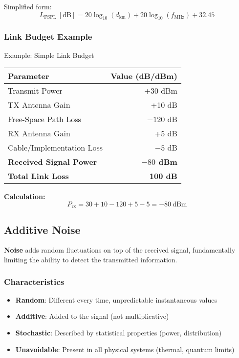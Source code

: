 Simplified form:
\begin{equation}
L_{\text{FSPL}}\ [\text{dB}] = 20\log_{10}(d_{\text{km}}) + 20\log_{10}(f_{\text{MHz}}) + 32.45
\end{equation}

\subsubsection{Link Budget Example}

\begin{calloutbox}{Example: Simple Link Budget}
\begin{tabular}{@{}lr@{}}
\toprule
\textbf{Parameter} & \textbf{Value (dB/dBm)} \\
\midrule
Transmit Power & +30 dBm \\
TX Antenna Gain & +10 dB \\
Free-Space Path Loss & $-120$ dB \\
RX Antenna Gain & +5 dB \\
Cable/Implementation Loss & $-5$ dB \\
\midrule
\textbf{Received Signal Power} & \textbf{$-80$ dBm} \\
\textbf{Total Link Loss} & \textbf{100 dB} \\
\bottomrule
\end{tabular}

\vspace{0.3cm}
\textbf{Calculation:}
\[
P_{\text{rx}} = 30 + 10 - 120 + 5 - 5 = -80\ \text{dBm}
\]
\end{calloutbox}

\subsection{Additive Noise}

\textbf{Noise} adds random fluctuations on top of the received signal, fundamentally limiting the ability to detect the transmitted information.

\subsubsection{Characteristics}

\begin{itemize}
\item \textbf{Random}: Different every time, unpredictable instantaneous values
\item \textbf{Additive}: Added to the signal (not multiplicative)
\item \textbf{Stochastic}: Described by statistical properties (power, distribution)
\item \textbf{Unavoidable}: Present in all physical systems (thermal, quantum limits)
\end{itemize}


